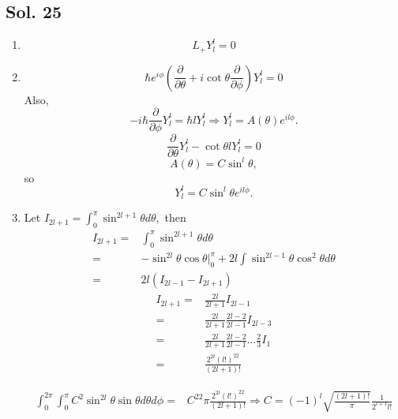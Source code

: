    \subsection*{Sol. 25}
   \begin{enumerate}
       \item $$
       L_+Y^l_l = 0
       $$
       \item 
       $$
       \hbar e^{i\phi}
       (\frac{\partial}{\partial\theta}+i\cot\theta\frac{\partial}{\partial\phi})Y^l_l = 0
       $$
       Also, 
       $$
       -i\hbar\frac{\partial}{\partial\phi} Y^l_l = \hbar lY^l_l
       \Rightarrow 
       Y^l_l = A(\theta)e^{il\phi}.
       $$
       $$
       \frac{\partial}{\partial\theta}
       Y^l_l 
       -\cot\theta lY^l_l = 0
       $$
       $$
       A(\theta)= C\sin^l\theta,
       $$
       so 
       $$
       Y^l_l = C\sin^l\theta e^{il\phi}.
       $$
       \item 
       Let $I_{2l+1} = \int_0^{\pi}\sin^{2l+1}\theta d\theta,$
       then 
       \begin{align*}
           I_{2l+1} =&  \int_0^{\pi}\sin^{2l+1}\theta d\theta\\
           =&-\sin^{2l}\theta \cos\theta 
           \bigg|_0^\pi 
           +2l\int\sin^{2l-1}\theta \cos^2\theta d\theta \\
           =&2l(I_{2l-1} - I_{2l+1})
       \end{align*}
       \begin{align*}
      I_{2l+1} =& \frac{2l}{2l+1}I_{2l-1}\\
      =&\frac{2l}{2l+1}\frac{2l-2}{2l-1}I_{2l-3}\\
      =&\frac{2l}{2l+1}\frac{2l-2}{2l-1}\dots \frac{2}{3}I_1\\
      =&\frac{2^{2l}(l!)^22}{(2l+1)!}
       \end{align*}

       \begin{align*}
           \int_0^{2\pi}
           \int_0^\pi
           C^2\sin^{2l}\theta 
           \sin\theta d\theta d\phi
           =&C^22\pi\frac{2^{2l}(l!)^22}{(2l+1)!}
           \Rightarrow 
           C = (-1)^l\sqrt{\frac{(2l+1)!}{\pi}}
           \frac{1}{2^{l+1}l!}
       \end{align*}
      
   \end{enumerate}
